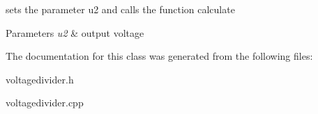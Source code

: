 sets the parameter u2 and calls the function calculate 


\begin{DoxyParams}{Parameters}
{\em u2} & output voltage \\
\hline
\end{DoxyParams}


The documentation for this class was generated from the following files\+:\begin{DoxyCompactItemize}
\item 
voltagedivider.\+h\item 
voltagedivider.\+cpp\end{DoxyCompactItemize}
